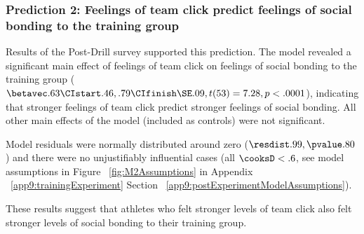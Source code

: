 




\subsubsection{Prediction 2: Feelings of team click predict feelings of social bonding to the training group}



Results of the Post-Drill survey supported this prediction. The model revealed a significant main effect of feelings of team click on feelings of social bonding to the training group ($\betavec .63 \CIstart .46, .79 \CIfinish \SE .09, t(53) = 7.28, p < .0001$), indicating that stronger feelings of team click predict stronger feelings of social bonding.  All other main effects of the model (included as controls) were not significant.

Model residuals were normally distributed around zero ($\resdist .99, \pvalue .80$) and there were no unjustifiably influential cases (all $\cooksD < .6$, see model assumptions in Figure ~\ref{fig:M2Assumptions} in Appendix ~\ref{app9:trainingExperiment} Section ~\ref{app9:postExperimentModelAssumptions}).

These results suggest that athletes who felt stronger levels of team click also felt stronger levels of social bonding to their training group.




